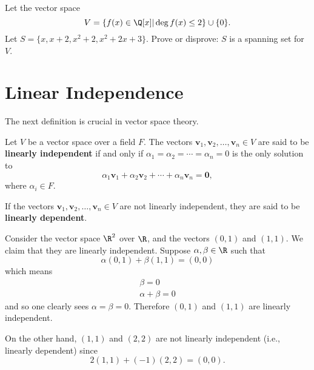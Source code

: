 \begin{exercise}
    Let the vector space
    \[
        V = \{f(x) \in \Q[x] \vert \deg f(x) \leq 2\} \cup \{0\}.
    \]
    Let $S = \{x, x + 2, x^2 + 2, x^2 + 2x + 3\}$. Prove or disprove: $S$ is a spanning set for $V$.
\end{exercise}

\section{Linear Independence}
The next definition is crucial in vector space theory.
\begin{definition}
    Let $V$ be a vector space over a field $F$. The vectors $\textbf{v}_1, \textbf{v}_2, \dots, \textbf{v}_n \in V$ are said to be \textbf{linearly independent} if and only if $\alpha_1 = \alpha_2 = \cdots = \alpha_n = 0$ is the only solution to
    \[
        \alpha_1\textbf{v}_1 + \alpha_2\textbf{v}_2 + \cdots + \alpha_n\textbf{v}_n = \textbf{0},
    \]
    where $\alpha_i \in F$.

    If the vectors $\textbf{v}_1, \textbf{v}_2, \dots, \textbf{v}_n \in V$ are not linearly independent, they are said to be \textbf{linearly dependent}.
\end{definition}

\begin{example}
    Consider the vector space $\R^2$ over $\R$, and the vectors $(0, 1)$ and $(1, 1)$. We claim that they are linearly independent. Suppose $\alpha, \beta \in \R$ such that
    \[
        \alpha(0, 1) + \beta(1, 1) = (0, 0)
    \]
    which means
    \begin{align*}
        \beta = 0\\
        \alpha + \beta = 0
    \end{align*}
    and so one clearly sees $\alpha = \beta = 0$. Therefore $(0, 1)$ and $(1, 1)$ are linearly independent.

    On the other hand, $(1, 1)$ and $(2, 2)$ are not linearly independent (i.e., linearly dependent) since
    \[
        2(1,1) + (-1)(2, 2) = (0, 0).
    \]
\end{example}

